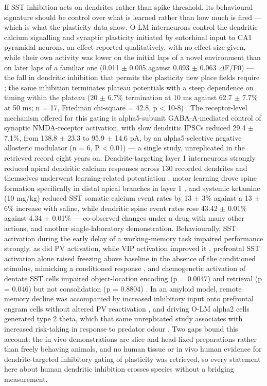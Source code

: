 \documentclass[11pt]{article}
\begin{document}
If SST inhibition acts on dendrites rather than spike threshold, its behavioural signature should be control over what is learned rather than how much is fired --- which is what the plasticity data show. O-LM interneurons control the dendritic calcium signalling and synaptic plasticity initiated by entorhinal input to CA1 pyramidal neurons, an effect reported qualitatively, with no effect size given, while their own activity was lower on the initial laps of a novel environment than on later laps of a familiar one (0.011 $\pm$ 0.005 against 0.093 $\pm$ 0.063 $\Delta$F/F0) --- the fall in dendritic inhibition that permits the plasticity new place fields require \citep{Udakis2025}; the same inhibition terminates plateau potentials with a steep dependence on timing within the plateau (20 $\pm$ 6.7\% termination at 10 ms against 62.7 $\pm$ 7.7\% at 50 ms; n = 17, Friedman chi-square = 42.8, p < 10-8) \citep{Vaasjo2026}. The receptor-level mechanism offered for this gating is alpha5-subunit GABA-A-mediated control of synaptic NMDA-receptor activation, with slow dendritic IPSCs reduced 29.4 $\pm$ 7.1\%, from 138.8 $\pm$ 23.3 to 95.9 $\pm$ 14.6 pA, by an alpha5-selective negative allosteric modulator (n = 6, P < 0.01) \citep{Schulz2018} --- a single study, unreplicated in the retrieved record eight years on. Dendrite-targeting layer 1 interneurons strongly reduced apical dendritic calcium responses across 130 recorded dendrites and themselves underwent learning-related potentiation \citep{Abs2018}, motor learning drove spine formation specifically in distal apical branches in layer 1 \citep{Chen2015}, and systemic ketamine (10 mg/kg) reduced SST somatic calcium event rates by 13 $\pm$ 3\% against a 13 $\pm$ 6\% increase with saline, while dendritic spine event rates rose 43.42 $\pm$ 0.01\% against 4.34 $\pm$ 0.01\% \citep{Ali2020} --- co-observed changes under a drug with many other actions, and another single-laboratory demonstration. Behaviourally, SST activation during the early delay of a working-memory task impaired performance strongly, as did PV activation, while VIP activation improved it \citep{Kamigaki2017}, prefrontal SST activation alone raised freezing above baseline in the absence of the conditioned stimulus, mimicking a conditioned response \citep{Cummings2019}, and chemogenetic activation of dentate SST cells impaired object-location encoding (p = 0.0047) and retrieval (p = 0.046) but not consolidation (p = 0.8804) \citep{Raven2026}. In an amyloid model, remote memory decline was accompanied by increased inhibitory input onto prefrontal engram cells without altered PV reactivation \citep{VanAdrichem2025}, and driving O-LM alpha2 cells generated type 2 theta, which that same unreplicated study associates with increased risk-taking in response to predator odour \citep{Mikulovic2018}. Two gaps bound this account: the in vivo demonstrations are slice and head-fixed preparations rather than freely behaving animals, and no human tissue or in vivo human evidence for dendrite-targeted inhibitory gating of plasticity was retrieved, so every statement here about human dendritic inhibition crosses species without a bridging measurement.
\end{document}
